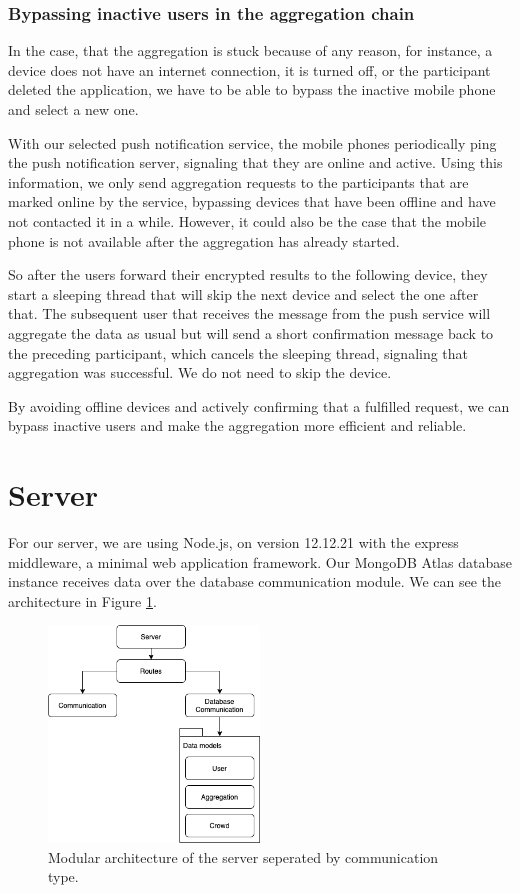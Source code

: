 \subsubsection{Bypassing inactive users in the aggregation chain}
In the case, that the aggregation is stuck because of any reason, for instance, a device does not have an internet connection, it is turned off, or the participant deleted the application, we have to be able to bypass the inactive mobile phone and select a new one.

With our selected push notification service, the mobile phones periodically ping the push notification server, signaling that they are online and active. Using this information, we only send aggregation requests to the participants that are marked online by the service, bypassing devices that have been offline and have not contacted it in a while. However, it could also be the case that the mobile phone is not available after the aggregation has already started.

So after the users forward their encrypted results to the following device, they start a sleeping thread that will skip the next device and select the one after that. The subsequent user that receives the message from the push service will aggregate the data as usual but will send a short confirmation message back to the preceding participant, which cancels the sleeping thread, signaling that aggregation was successful. We do not need to skip the device.

By avoiding offline devices and actively confirming that a fulfilled request, we can bypass inactive users and make the aggregation more efficient and reliable.

\section{Server}
For our server, we are using Node.js, on version 12.12.21 with the express \cite{express} middleware, a minimal web application framework. Our MongoDB Atlas database instance receives data over the database communication module. We can see the architecture in Figure \ref{fig:server}.

\begin{figure}[htpb]
  \centering
  \includegraphics[width=0.5\textwidth]{figures/server}
  \caption{Modular architecture of the server seperated by communication type.} \label{fig:server}
\end{figure}

